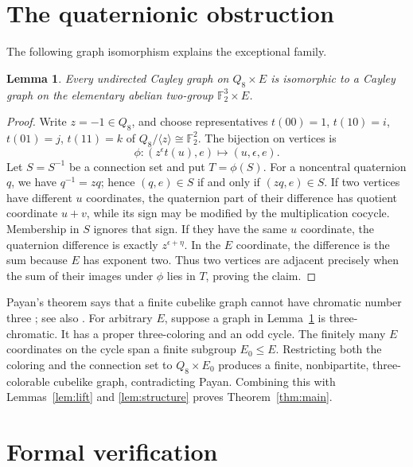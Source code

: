\documentclass[11pt]{article}
\newtheorem{lemma}{Lemma}
\newcommand{\F}{\mathbb F}
\begin{document}
\section{The quaternionic obstruction}

The following graph isomorphism explains the exceptional family.

\begin{lemma}\label{lem:cubelike}
Every undirected Cayley graph on $Q_8\times E$ is isomorphic to a
Cayley graph on the elementary abelian two-group $\F_2^3\times E$.
\end{lemma}
\begin{proof}
Write $z=-1\in Q_8$, and choose representatives
$t(00)=1$, $t(10)=i$, $t(01)=j$, $t(11)=k$ of
$Q_8/\langle z\rangle\cong\F_2^2$. The bijection on vertices is
\[
          \phi:(z^\epsilon t(u),e)\longmapsto(u,\epsilon,e).
\]
Let $S=S^{-1}$ be a connection set and put $T=\phi(S)$.
For a noncentral quaternion $q$, we have $q^{-1}=zq$; hence
$(q,e)\in S$ if and only if $(zq,e)\in S$.
If two vertices have different $u$ coordinates, the quaternion part
of their difference has quotient coordinate $u+v$, while its sign
may be modified by the multiplication cocycle. Membership in $S$
ignores that sign. If they have the same $u$ coordinate, the
quaternion difference is exactly $z^{\epsilon+\eta}$.
In the $E$ coordinate, the difference is the sum because $E$ has
exponent two. Thus two vertices are adjacent precisely when the sum of
their images under $\phi$ lies in $T$, proving the claim.
\end{proof}

Payan's theorem says that a finite cubelike graph cannot have
chromatic number three \cite{Payan}; see also
\cite[Theorem~1.1]{KrebsSankar}. For arbitrary $E$, suppose a
graph in Lemma~\ref{lem:cubelike} is three-chromatic. It has a
proper three-coloring and an odd cycle. The finitely many $E$
coordinates on the cycle span a finite subgroup $E_0\leq E$.
Restricting both the coloring and the connection set to
$Q_8\times E_0$ produces a finite, nonbipartite, three-colorable
cubelike graph, contradicting Payan. Combining this with
Lemmas~\ref{lem:lift} and \ref{lem:structure} proves
Theorem~\ref{thm:main}.

\section{Formal verification}
\end{document}
